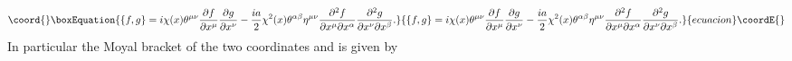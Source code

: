 \documentclass[a4paper,12pt]{article}
\begin{document}
\begin{equation}\coord{}\boxEquation{
\{f,g\}= i{\chi}(x){\theta}^{{\mu}{\nu}}
\frac{\partial{f}}{\partial{x^{\mu}}}\frac{\partial{g}}{\partial{x^{\nu}}}
-
\frac{ia}{2}{\chi}^2(x){\theta}^{{\alpha}{\beta}}{\eta}^{{\mu}{\nu}}
\frac{{\partial}^2{f}}{\partial{x^{\mu}}\partial{x^{\alpha}}}\frac{{\partial}^2{g}}{\partial{x^{\nu}}\partial{x^{\beta}}}.
}{
\{f,g\}= i{\chi}(x){\theta}^{{\mu}{\nu}}
\frac{\partial{f}}{\partial{x^{\mu}}}\frac{\partial{g}}{\partial{x^{\nu}}}
-
\frac{ia}{2}{\chi}^2(x){\theta}^{{\alpha}{\beta}}{\eta}^{{\mu}{\nu}}
\frac{{\partial}^2{f}}{\partial{x^{\mu}}\partial{x^{\alpha}}}\frac{{\partial}^2{g}}{\partial{x^{\nu}}\partial{x^{\beta}}}.
}{ecuacion}\coordE{}\end{equation}
In particular the Moyal bracket of the two coordinates \coordHE{} and \coordHE{} is given by
\end{document}
